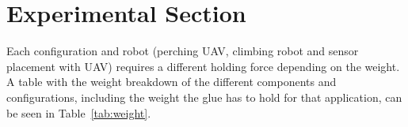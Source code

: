 



\section{Experimental Section}
\label{sec:experimental_section}


Each configuration and robot (perching UAV, climbing robot and sensor placement with UAV) requires a different holding force depending on the weight.
A table with the weight breakdown of the different components and configurations, including the weight the glue has to hold for that application, can be seen in Table~\ref{tab:weight}.





